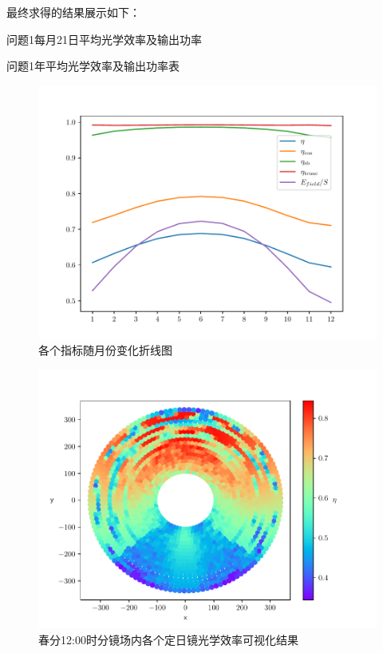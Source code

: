 \documentclass[../main.tex]{subfiles}
\begin{document}
最终求得的结果展示如下：
%
\begin{table}[H]
\centering
\caption{\kaishu 问题1每月21日平均光学效率及输出功率}

\end{table}
%
\begin{table}[H]
\centering
\caption{\kaishu 问题1年平均光学效率及输出功率表}

\end{table}
%
\begin{figure}[H]
\centering
\includegraphics[scale = 0.5]{zhexiantu.pdf}
\caption{\kaishu 各个指标随月份变化折线图}
\end{figure}
%
\begin{figure}[H]
\centering
\includegraphics[scale =0.7]{rainbow.pdf}
\caption{\kaishu 春分{\rm 12:00}时分镜场内各个定日镜光学效率可视化结果}\label{rainbow}
\end{figure}
\end{document}
